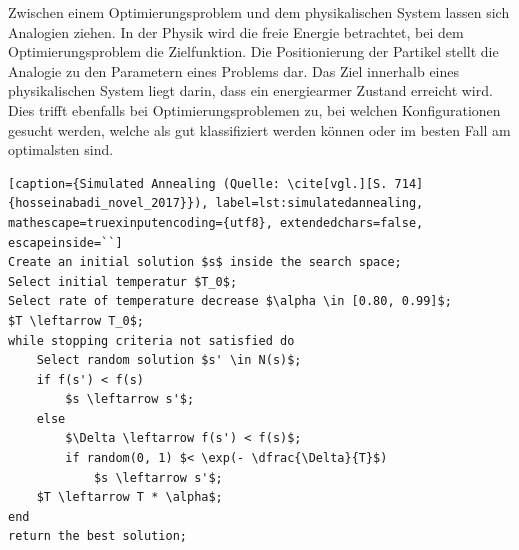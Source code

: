 Zwischen einem Optimierungsproblem und dem physikalischen System lassen sich Analogien ziehen. In der Physik wird die freie Energie betrachtet, bei dem Optimierungsproblem die Zielfunktion. Die Positionierung der Partikel stellt die Analogie zu den Parametern eines Problems dar. Das Ziel innerhalb eines physikalischen System liegt darin, dass ein energiearmer Zustand erreicht wird. Dies trifft ebenfalls bei Optimierungsproblemen zu, bei welchen Konfigurationen gesucht werden, welche als \glqq gut\grqq{} klassifiziert werden können oder im besten Fall am optimalsten sind. \cite[vgl.][S. 20]{siarry_metaheuristics_2016} 

\begin{lstlisting}[caption={Simulated Annealing (Quelle: \cite[vgl.][S. 714]{hosseinabadi_novel_2017}}), label=lst:simulatedannealing, mathescape=truexinputencoding={utf8}, extendedchars=false, escapeinside=``]
Create an initial solution $s$ inside the search space;
Select initial temperatur $T_0$;
Select rate of temperature decrease $\alpha \in [0.80, 0.99]$;
$T \leftarrow T_0$;  
while stopping criteria not satisfied do
    Select random solution $s' \in N(s)$;
    if f(s') < f(s)
        $s \leftarrow s'$;
    else
        $\Delta \leftarrow f(s') < f(s)$; 
        if random(0, 1) $< \exp(- \dfrac{\Delta}{T}$)
            $s \leftarrow s'$;
    $T \leftarrow T * \alpha$;
end
return the best solution;
\end{lstlisting}

